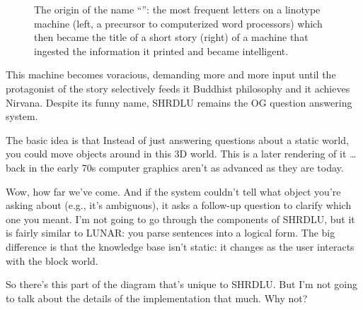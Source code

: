 \begin{figure}[!ht]
    \hfill
    \caption{The origin of the name ``'': the most frequent
    letters on a linotype machine (left, a precursor to computerized word
    processors) which then became the title of a short story (right) of a
    machine that ingested the information it printed and became intelligent.}
    \label{fig:ir:linotype}
  \end{figure}


This machine becomes voracious, demanding
more and more input until the protagonist
%
of the story selectively feeds it Buddhist
philosophy and it achieves Nirvana.
%
Despite its funny name, SHRDLU remains the
OG question answering system.

The basic idea is that Instead of just answering
questions about a static world, you could
move objects around in this 3D world.
%
This is a later rendering of it … back in
the early 70s computer graphics aren’t as
advanced as they are today.


Wow, how far we’ve come.
%
And if the system couldn’t tell what object
you’re asking about (e.g., it’s ambiguous),
%
it asks a follow-up question to clarify which
one you meant.
%
I’m not going to go through the components
of SHRDLU, but it is fairly similar to LUNAR:
%
you parse sentences into a logical form.
%
The big difference is that the knowledge base
isn’t static: it changes as the user interacts
%
with the block world.

So there’s this part of the diagram that’s
unique to SHRDLU.
%
But I’m not going to talk about the details
of the implementation that much.
%
Why not?

